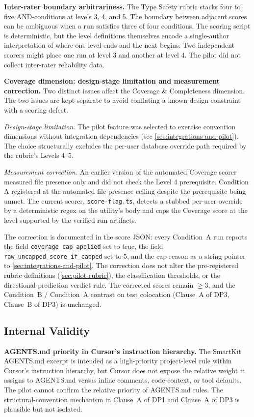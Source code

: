 \documentclass[12pt,a4paper]{report}
\begin{document}
\textbf{Inter-rater boundary arbitrariness.} The Type Safety rubric stacks four to five AND-conditions at levels 3, 4, and 5. The boundary between adjacent scores can be ambiguous when a run satisfies three of four conditions. The scoring script is deterministic, but the level definitions themselves encode a single-author interpretation of where one level ends and the next begins. Two independent scorers might place one run at level 3 and another at level 4. The pilot did not collect inter-rater reliability data.

\textbf{Coverage dimension: design-stage limitation and measurement correction.} Two distinct issues affect the Coverage \& Completeness dimension. The two issues are kept separate to avoid conflating a known design constraint with a scoring defect.

\textit{Design-stage limitation.} The pilot feature was selected to exercise convention dimensions without integration dependencies (see \autoref{sec:integrations-and-pilot}). The choice structurally excludes the per-user database override path required by the rubric's Levels 4--5.

\textit{Measurement correction.} An earlier version of the automated Coverage scorer measured file presence only and did not check the Level 4 prerequisite. Condition A registered at the automated file-presence ceiling despite the prerequisite being unmet. The current scorer, \texttt{score-flag.ts}, detects a stubbed per-user override by a deterministic regex on the utility's body and caps the Coverage score at the level supported by the verified run artifacts.

The correction is documented in the score JSON: every Condition~A run reports the field \texttt{coverage\_cap\_applied} set to true, the field \texttt{raw\_uncapped\_score\_if\_capped} set to 5, and the cap reason as a string pointer to \autoref{sec:integrations-and-pilot}. The correction does not alter the pre-registered rubric definitions (\autoref{sec:pilot-rubric}), the classification thresholds, or the directional-prediction verdict rule. The corrected scores remain $\geq 3$, and the Condition~B / Condition~A contrast on test colocation (Clause~A of DP3, Clause~B of DP3) is unchanged.

\subsection{Internal Validity}
\label{sec:internal-validity}

\textbf{AGENTS.md priority in Cursor's instruction hierarchy.} The SmartKit AGENTS.md excerpt is intended as a high-priority project-level rule within Cursor's instruction hierarchy, but Cursor does not expose the relative weight it assigns to AGENTS.md versus inline comments, code-context, or tool defaults. The pilot cannot confirm the relative priority of AGENTS.md rules. The structural-convention mechanism in Clause~A of DP1 and Clause~A of DP3 is plausible but not isolated.
\end{document}

